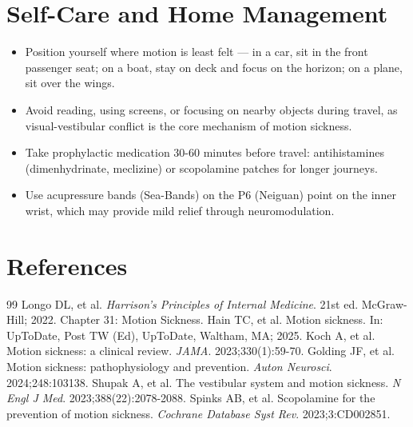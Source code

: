 \section*{Self-Care and Home Management}
\begin{itemize}
  \item Position yourself where motion is least felt — in a car, sit in the front passenger seat; on a boat, stay on deck and focus on the horizon; on a plane, sit over the wings.
  \item Avoid reading, using screens, or focusing on nearby objects during travel, as visual-vestibular conflict is the core mechanism of motion sickness.
  \item Take prophylactic medication 30-60 minutes before travel: antihistamines (dimenhydrinate, meclizine) or scopolamine patches for longer journeys.
  \item Use acupressure bands (Sea-Bands) on the P6 (Neiguan) point on the inner wrist, which may provide mild relief through neuromodulation.
\end{itemize}

\section*{References}

\begin{thebibliography}{99}
 Longo DL, et al. \emph{Harrison's Principles of Internal Medicine}. 21st ed. McGraw-Hill; 2022. Chapter 31: Motion Sickness.
 Hain TC, et al. Motion sickness. In: UpToDate, Post TW (Ed), UpToDate, Waltham, MA; 2025.
 Koch A, et al. Motion sickness: a clinical review. \emph{JAMA}. 2023;330(1):59-70.
 Golding JF, et al. Motion sickness: pathophysiology and prevention. \emph{Auton Neurosci}. 2024;248:103138.
 Shupak A, et al. The vestibular system and motion sickness. \emph{N Engl J Med}. 2023;388(22):2078-2088.
 Spinks AB, et al. Scopolamine for the prevention of motion sickness. \emph{Cochrane Database Syst Rev}. 2023;3:CD002851.
\end{thebibliography}
